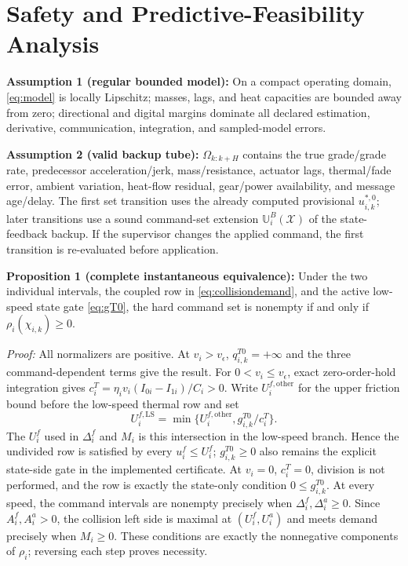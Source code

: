 \section{Safety and Predictive-Feasibility Analysis}
\textbf{Assumption 1 (regular bounded model):} On a compact operating domain, \eqref{eq:model} is locally Lipschitz; masses, lags, and heat capacities are bounded away from zero; directional and digital margins dominate all declared estimation, derivative, communication, integration, and sampled-model errors.

\textbf{Assumption 2 (valid backup tube):} $\Omega_{k:k+H}$ contains the true grade/grade rate, predecessor acceleration/jerk, mass/resistance, actuator lags, thermal/fade error, ambient variation, heat-flow residual, gear/power availability, and message age/delay. The first set transition uses the already computed provisional $u_{i,k}^{*,0}$; later transitions use a sound command-set extension $\mathbb U_i^B(\mathcal X)$ of the state-feedback backup. If the supervisor changes the applied command, the first transition is re-evaluated before application.

\textbf{Proposition 1 (complete instantaneous equivalence):} Under the two individual intervals, the coupled row in \eqref{eq:collisiondemand}, and the active low-speed state gate \eqref{eq:gT0}, the hard command set is nonempty if and only if $\rho_i(\chi_{i,k})\ge0$.

\emph{Proof:} All normalizers are positive. At $v_i>v_\epsilon$, $q_{i,k}^{T0}=+\infty$ and the three command-dependent terms give the result. For $0<v_i\le v_\epsilon$, exact zero-order-hold integration gives $c_i^T=\eta_i v_i(I_{0i}-I_{1i})/C_i>0$. Write $U_i^{f,\mathrm{other}}$ for the upper friction bound before the low-speed thermal row and set
\begin{equation}\label{eq:low-speed-upper}
U_i^{f,\mathrm{LS}}=\min\{U_i^{f,\mathrm{other}},g_{i,k}^{T0}/c_i^T\}.
\end{equation}
The $U_i^f$ used in $\Delta_i^f$ and $M_i$ is this intersection in the low-speed branch. Hence the undivided row is satisfied by every $u_i^f\le U_i^f$; $g_{i,k}^{T0}\ge0$ also remains the explicit state-side gate in the implemented certificate. At $v_i=0$, $c_i^T=0$, division is not performed, and the row is exactly the state-only condition $0\le g_{i,k}^{T0}$. At every speed, the command intervals are nonempty precisely when $\Delta_i^f,\Delta_i^a\ge0$. Since $A_i^f,A_i^a>0$, the collision left side is maximal at $(U_i^f,U_i^a)$ and meets demand precisely when $M_i\ge0$. These conditions are exactly the nonnegative components of $\rho_i$; reversing each step proves necessity.

